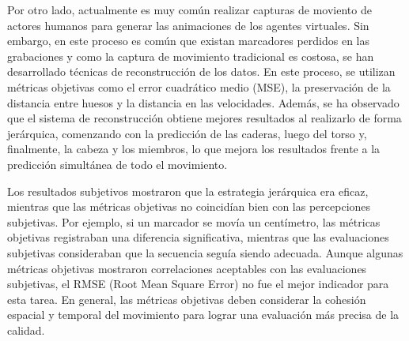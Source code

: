 Por otro lado, actualmente es muy común realizar capturas de moviento de actores humanos para generar las animaciones de los agentes virtuales. Sin embargo, en este proceso es común que existan marcadores perdidos en las grabaciones y como la captura de movimiento tradicional es costosa, se han desarrollado técnicas de reconstrucción de los datos. En este proceso, se utilizan métricas objetivas como el error cuadrático medio (MSE), la preservación de la distancia entre huesos y la distancia en las velocidades. Además, se ha observado que el sistema de reconstrucción obtiene mejores resultados al realizarlo de forma jerárquica, comenzando con la predicción de las caderas, luego del torso y, finalmente,  la cabeza y los miembros, lo que mejora los resultados frente a la predicción simultánea de todo el movimiento.

Los resultados subjetivos mostraron que la estrategia jerárquica era eficaz, mientras que las métricas objetivas no coincidían bien con las percepciones subjetivas. Por ejemplo, si un marcador se movía un centímetro, las métricas objetivas registraban una diferencia significativa, mientras que las evaluaciones subjetivas consideraban que la secuencia seguía siendo adecuada. Aunque algunas métricas objetivas mostraron correlaciones aceptables con las evaluaciones subjetivas, el RMSE (Root Mean Square Error) no fue el mejor indicador para esta tarea. En general, las métricas objetivas deben considerar la cohesión espacial y temporal del movimiento para lograr una evaluación más precisa de la calidad.
